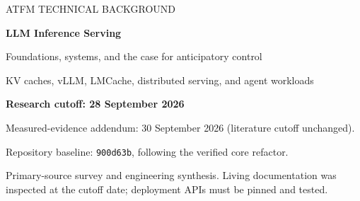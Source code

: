 \documentclass[11pt]{article}
\begin{document}
\begin{titlepage}
\vspace*{1.0cm}
{\color{navy}\large ATFM TECHNICAL BACKGROUND\par}
\vspace{0.7cm}
{\Huge\bfseries LLM Inference Serving\par}
\vspace{0.4cm}
{\LARGE Foundations, systems, and the case for anticipatory control\par}
\vspace{0.9cm}
{\large KV caches, vLLM, LMCache, distributed serving, and agent workloads\par}
\vspace{1cm}
\textbf{Research cutoff: 28 September 2026}\par
Measured-evidence addendum: 30 September 2026 (literature cutoff unchanged).\par
Repository baseline: \texttt{900d63b}, following the verified core refactor.\par
\vspace{0.7cm}
\begin{abstract}
An LLM service converts a stream of variable-length, stateful computations into
latency-constrained responses. Efficient matrix multiplication is necessary, but
so are memory allocation, batching, cache reuse, data movement, routing, and
admission control. Agent workloads add a further complication: a session can
stop generating tokens while a tool runs, yet return with a large reusable
context. The best immediate request decision need not be the best session or
fleet decision.

This paper develops the serving stack from first principles, derives the main
memory, compute, bandwidth, and queueing relationships, and maps major research
and open-source systems onto the problems they solve. It covers paged attention,
continuous batching, prefix reuse, cache tiers, prefill/decode disaggregation,
parallelism, compression, and program-aware scheduling. It then defines ATFM's
potential contribution precisely: using observations available before an agent's
next request to estimate future demand and inform bounded control actions.
Existing systems already address substantial parts of this problem. The paper
therefore gives both the case for ATFM and conditions under which it adds no
value, with a comparison and evaluation plan that can falsify the hypothesis.
All numerical illustrations are derived examples unless explicitly identified as
repository measurements. Section~\ref{sec:measured} summarizes ATFM's own
baseline vLLM/LMCache GPU measurements from 29--30 September 2026; no ATFM
policy speedup is claimed.
\end{abstract}
\vfill
\noindent\small Primary-source survey and engineering synthesis. Living documentation
was inspected at the cutoff date; deployment APIs must be pinned and tested.
\end{titlepage}
\end{document}

